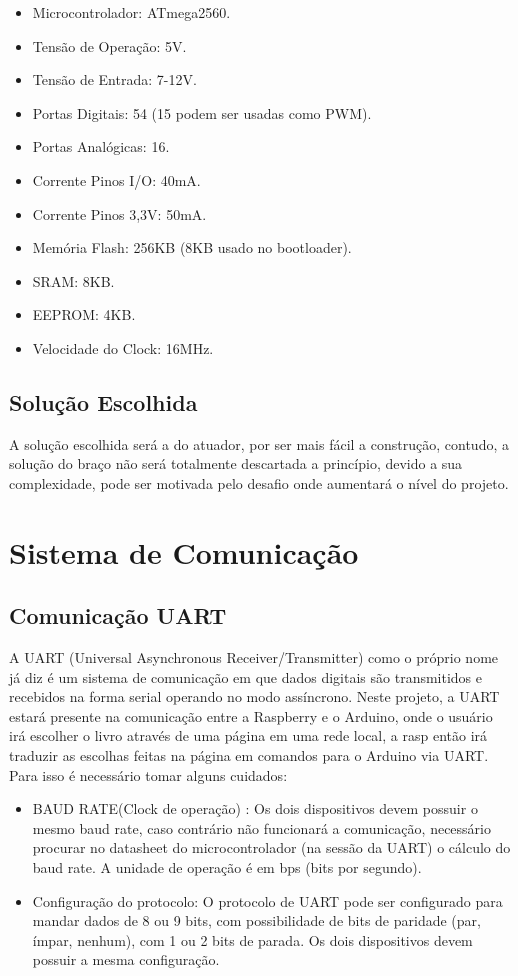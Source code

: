 \begin{itemize}
\item Microcontrolador: ATmega2560.
\item Tensão de Operação: 5V.
\item Tensão de Entrada: 7-12V.
\item Portas Digitais: 54 (15 podem ser usadas como PWM).
\item Portas Analógicas: 16.
\item Corrente Pinos I/O: 40mA.
\item Corrente Pinos 3,3V: 50mA.
\item Memória Flash: 256KB (8KB usado no bootloader).
\item SRAM: 8KB.
\item EEPROM: 4KB.
\item Velocidade do Clock: 16MHz.
\end{itemize}

\subsection{Solução Escolhida}
A solução escolhida será a do atuador, por ser mais fácil a construção, contudo, a solução do braço  não será totalmente descartada a princípio, devido a sua complexidade, pode ser motivada pelo desafio onde aumentará o nível do projeto.

\section{Sistema de Comunicação}
\subsection{Comunicação UART}
A UART (Universal Asynchronous Receiver/Transmitter) como o próprio nome já diz é um sistema de comunicação em que dados digitais são transmitidos e recebidos na forma serial operando no modo assíncrono. Neste projeto, a UART estará presente na comunicação entre a Raspberry e o Arduino, onde o usuário irá escolher o livro através de uma página em uma rede local, a rasp então irá traduzir as escolhas feitas na página em comandos para o Arduino via UART. Para isso é necessário tomar alguns cuidados:

\begin{itemize}
\item BAUD RATE(Clock de operação) : Os dois dispositivos devem possuir o mesmo baud rate, caso contrário não funcionará a comunicação, necessário procurar no datasheet do microcontrolador (na sessão da UART) o cálculo do baud rate. A unidade de operação é em bps (bits por segundo).
\item Configuração do protocolo: O protocolo de UART pode ser configurado para mandar dados de 8 ou 9 bits, com possibilidade de bits de paridade (par, ímpar, nenhum), com 1 ou 2 bits de parada. Os dois dispositivos devem possuir a mesma configuração.
\end{itemize}

